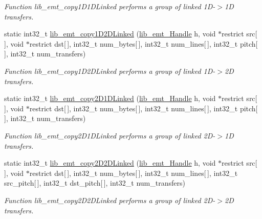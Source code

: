 \begin{DoxyCompactItemize}
\begin{DoxyCompactList}\small\item\em Function lib\+\_\+emt\+\_\+copy1\+D1\+D\+Linked performs a group of linked 1\+D-\/$>$1\+D transfers. \end{DoxyCompactList}\item 
static int32\+\_\+t \hyperlink{group__libarch__memtrans_gaa0783528473328cd5a809bd528bea150}{lib\+\_\+emt\+\_\+copy1\+D2\+D\+Linked} (\hyperlink{group__libarch__memtrans_ga3ee110c7c5d95cfe386b113d2d078ec3}{lib\+\_\+emt\+\_\+\+Handle} h, void $\ast$restrict src\mbox{[}$\,$\mbox{]}, void $\ast$restrict dst\mbox{[}$\,$\mbox{]}, int32\+\_\+t num\+\_\+bytes\mbox{[}$\,$\mbox{]}, int32\+\_\+t num\+\_\+lines\mbox{[}$\,$\mbox{]}, int32\+\_\+t pitch\mbox{[}$\,$\mbox{]}, int32\+\_\+t num\+\_\+transfers)
\begin{DoxyCompactList}\small\item\em Function lib\+\_\+emt\+\_\+copy1\+D2\+D\+Linked performs a group of linked 1\+D-\/$>$2\+D transfers. \end{DoxyCompactList}\item 
static int32\+\_\+t \hyperlink{group__libarch__memtrans_gaae7bb385b41241410af0b5e917158e7b}{lib\+\_\+emt\+\_\+copy2\+D1\+D\+Linked} (\hyperlink{group__libarch__memtrans_ga3ee110c7c5d95cfe386b113d2d078ec3}{lib\+\_\+emt\+\_\+\+Handle} h, void $\ast$restrict src\mbox{[}$\,$\mbox{]}, void $\ast$restrict dst\mbox{[}$\,$\mbox{]}, int32\+\_\+t num\+\_\+bytes\mbox{[}$\,$\mbox{]}, int32\+\_\+t num\+\_\+lines\mbox{[}$\,$\mbox{]}, int32\+\_\+t pitch\mbox{[}$\,$\mbox{]}, int32\+\_\+t num\+\_\+transfers)
\begin{DoxyCompactList}\small\item\em Function lib\+\_\+emt\+\_\+copy2\+D1\+D\+Linked performs a group of linked 2\+D-\/$>$1\+D transfers. \end{DoxyCompactList}\item 
static int32\+\_\+t \hyperlink{group__libarch__memtrans_gaef9d8b5dd3d94847af102329ead8a081}{lib\+\_\+emt\+\_\+copy2\+D2\+D\+Linked} (\hyperlink{group__libarch__memtrans_ga3ee110c7c5d95cfe386b113d2d078ec3}{lib\+\_\+emt\+\_\+\+Handle} h, void $\ast$restrict src\mbox{[}$\,$\mbox{]}, void $\ast$restrict dst\mbox{[}$\,$\mbox{]}, int32\+\_\+t num\+\_\+bytes\mbox{[}$\,$\mbox{]}, int32\+\_\+t num\+\_\+lines\mbox{[}$\,$\mbox{]}, int32\+\_\+t src\+\_\+pitch\mbox{[}$\,$\mbox{]}, int32\+\_\+t dst\+\_\+pitch\mbox{[}$\,$\mbox{]}, int32\+\_\+t num\+\_\+transfers)
\begin{DoxyCompactList}\small\item\em Function lib\+\_\+emt\+\_\+copy2\+D2\+D\+Linked performs a group of linked 2\+D-\/$>$2\+D transfers. \end{DoxyCompactList}\item 

\end{DoxyCompactItemize}
